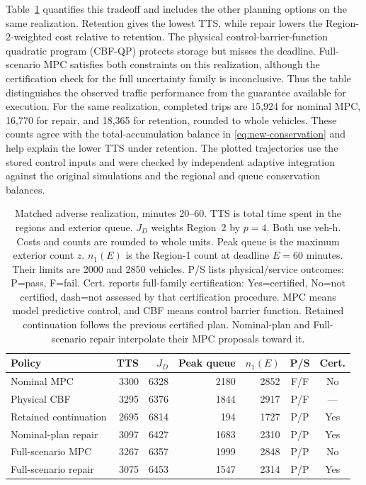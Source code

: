 \documentclass[preprint,12pt]{elsarticle}
\theoremstyle{definition}
\theoremstyle{plain}
\theoremstyle{definition}
\theoremstyle{plain}
\begin{document}
Table~\ref{tab:benchmark-conflict} quantifies this tradeoff and includes
the other planning options on the same realization. Retention gives the
lowest TTS, while repair lowers the Region-2-weighted cost relative to
retention. The physical control-barrier-function quadratic program
(CBF-QP) protects storage but misses the deadline. Full-scenario MPC
satisfies both constraints on this realization, although the certification check
for the full uncertainty family is inconclusive. Thus the table distinguishes the
observed traffic performance from the guarantee available for execution.
For the same realization, completed trips are 15,924 for nominal MPC,
16,770 for repair, and 18,365 for retention, rounded to whole vehicles.
These counts agree with the total-accumulation balance in
\eqref{eq:new-conservation} and help explain the lower TTS under retention.
The plotted trajectories use the stored control inputs and were checked by
independent adaptive integration against the original simulations and the
regional and queue conservation balances.

\begin{table}[!htbp]
\centering\footnotesize
\setlength{\belowcaptionskip}{6pt}
\caption{Matched adverse realization, minutes 20--60. TTS is total
time spent in the regions and exterior queue. $J_D$ weights Region~2 by
$p=4$. Both use veh-h. Costs and counts are rounded to whole
units. Peak queue is the maximum exterior count $z$. $n_1(E)$ is the
Region-1 count at deadline $E=60$ minutes. Their limits are 2000 and 2850
vehicles. P/S lists physical/service outcomes: P=pass, F=fail. Cert.
reports full-family certification: Yes=certified, No=not certified,
dash=not assessed by that certification procedure.
MPC means model predictive control, and CBF means control barrier function.
Retained continuation follows the previous certified plan. Nominal-plan
and Full-scenario repair interpolate their MPC proposals toward it.}
\label{tab:benchmark-conflict}
\setlength{\tabcolsep}{3pt}
\begin{tabular}{@{}lrrrrcc@{}}
\toprule
Policy & TTS & $J_D$ & Peak queue & $n_1(E)$ & P/S & Cert.\\
\midrule
Nominal MPC & 3300 & 6328 & 2180 & 2852 & F/F & No\\
Physical CBF & 3295 & 6376 & 1844 & 2917 & P/F & ---\\
Retained continuation & 2695 & 6814 & 194 & 1727 & P/P & Yes\\
Nominal-plan repair & 3097 & 6427 & 1683 & 2310 & P/P & Yes\\
Full-scenario MPC & 3267 & 6357 & 1999 & 2848 & P/P & No\\
Full-scenario repair & 3075 & 6453 & 1547 & 2314 & P/P & Yes\\
\bottomrule
\end{tabular}
\end{table}
\end{document}
